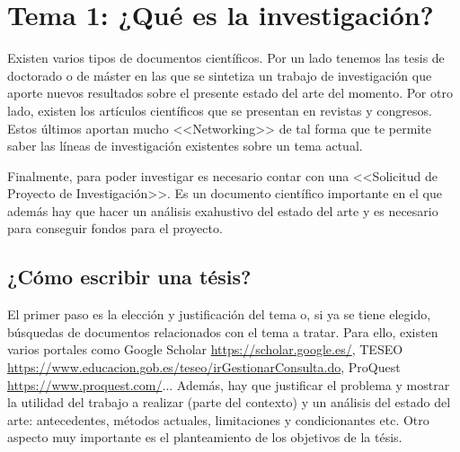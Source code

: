 
\newcommand{\estudiante}{García Justel, Alan}
\newcommand{\titulo}{MÁSTER EN INGENIERÍA COMPUTACIONAL Y SISTEMAS INTELIGENTES}
\newcommand{\asignatura}{METODOLOGÍAS Y TÉCNICAS DE INVESTIGACIÓN}
\newcommand{\portada}{common/no_signal.png}
\newcommand{\colorportada}{title_red}
\newcommand{\curso}{2024-2025}





\newpage


\section{Tema 1: ¿Qué es la investigación?}
Existen varios tipos de documentos científicos. Por un lado tenemos las tesis de doctorado o de máster en las que se sintetiza un trabajo de investigación que aporte nuevos resultados sobre el presente estado del arte del momento. Por otro lado, existen los artículos científicos que se presentan en revistas y congresos. Estos últimos aportan mucho <<Networking>> de tal forma que te permite saber las líneas de investigación existentes sobre un tema actual.

Finalmente, para poder investigar es necesario contar con una <<Solicitud de Proyecto de Investigación>>. Es un documento científico importante en el que además hay que hacer un análisis exahustivo del estado del arte y es necesario para conseguir fondos para el proyecto. 

\subsection{¿Cómo escribir una tésis?}
El primer paso es la elección y justificación del tema o, si ya se tiene elegido, búsquedas de documentos relacionados con el tema a tratar. Para ello, existen varios portales como Google Scholar \url{https://scholar.google.es/}, TESEO \url{https://www.educacion.gob.es/teseo/irGestionarConsulta.do}, ProQuest \url{https://www.proquest.com/}... Además, hay que justificar el problema y mostrar la utilidad del trabajo a realizar (parte del contexto) y un análisis del estado del arte: antecedentes, métodos actuales, limitaciones y condicionantes etc. Otro aspecto muy importante es el planteamiento de los objetivos de la tésis.

